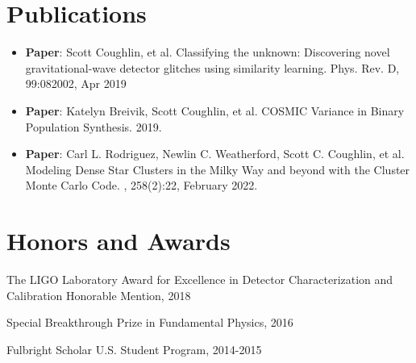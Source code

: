 \documentclass[a4paper,20pt]{article}
\newcommand{\resumeItem}[2]{
  \item\small{
    \textbf{#1}{: #2 \vspace{-2pt}}
  }
}
\newcommand{\resumeSubItem}[2]{\resumeItem{#1}{#2}\vspace{-3pt}}
\newcommand{\resumeSubHeadingListStart}{\begin{itemize}[leftmargin=*]}
\newcommand{\resumeSubHeadingListEnd}{\end{itemize}}
\begin{document}
\section{Publications}
\resumeSubHeadingListStart
\resumeSubItem{Paper}{Scott Coughlin, et al. Classifying the unknown: Discovering novel gravitational-wave detector glitches using similarity learning. Phys. Rev. D, 99:082002, Apr 2019}
\vspace{2pt}
\resumeSubItem{Paper}{Katelyn Breivik, Scott Coughlin, et al. COSMIC Variance in Binary Population Synthesis. 2019.}
\resumeSubItem{Paper}{Carl L. Rodriguez, Newlin C. Weatherford, Scott C. Coughlin, et al. Modeling Dense Star Clusters in the Milky Way and beyond with the Cluster Monte Carlo Code. , 258(2):22, February 2022.}


\resumeSubHeadingListEnd
\vspace{-5pt}
\section{Honors and Awards}
\begin{description}[font=$\bullet$]
\item {The LIGO Laboratory Award for Excellence in Detector Characterization and Calibration Honorable Mention, 2018}
\vspace{-5pt}
\item {Special Breakthrough Prize in Fundamental Physics, 2016}
\vspace{-5pt}
\item {Fulbright Scholar U.S. Student Program, 2014-2015}

\end{description}
\end{document}
